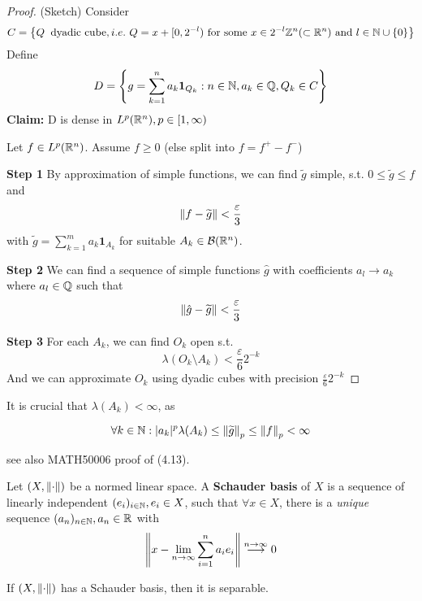 \documentclass{article}
\begin{document}
\begin{proof}
	(Sketch)  Consider
	$$
		C = \left\{Q\: \text{\ dyadic\ cube}, i.e. \ Q = x + [0, 2^{-l}) \text{\ for\ some\ } x \in 2^{-l} \inte^n(\subset \real^n) \text{\ and\ } l\in \natu \cup \{0\}\right\}
	$$
	Define
	$$
		D = \left\{g = \sum_{k=1}^n a_k \mathbf{1}_{Q_k}: n\in \mathbb{N}, a_k \in \mathbb{Q}, Q_k \in C \right\}
	$$
	\textbf{Claim:} D is dense in $L^p(\mathbb{R}^n), p \in [1, \infty)$

	Let $f \in L^p(\mathbb{R}^n)$. Assume $f \geq 0$ (else split into $f=f^+-f^-$)

	\textbf{Step 1} By approximation of simple functions, we can find $\widetilde{g}$ simple, s.t. $0 \leq \widetilde{g} \leq f$ and
	$$
		\left\|{f-\widetilde{g}}\right\| < \frac{\varepsilon}{3}
	$$
	with $\widetilde{g}=\sum_{k=1}^m a_k \mathbf{1}_{A_k}$ for suitable $A_k \in \mathcal{B}(\mathbb{R}^n)$.

	\textbf{Step 2} We can find a sequence of simple functions $\hat{g}$ with coefficients $a_l \to a_k$ where $a_l\in \mathbb{Q}$ such that
	$$
		\left\|{\hat{g}-\widetilde{g}}\right\| < \frac{\varepsilon}{3}
	$$

	\textbf{Step 3} For each $A_k$, we can find $O_k$ open s.t.
	$$
		\lambda(O_k\setminus A_k) < \frac{\varepsilon}{6} 2^{-k}
	$$
	And we can approximate $O_k$ using dyadic cubes with precision $\frac{\varepsilon}{6} 2^{-k}$
\end{proof}

It is crucial that $\lambda(A_k) < \infty$, as

$$
	\forall k \in \mathbb{N}: |a_k|^p \lambda(A_k) \leq \left\|{\widetilde{g}}\right\|_p \leq \left\|{f}\right\|_p < \infty
$$

see also MATH50006 proof of (4.13).

\begin{definition}

	Let $(X,\left\|{\cdot}\right\|)$ be a normed linear space. A \textbf{Schauder basis} of $X$ is a sequence of linearly independent $(e_i)_{i\in \mathbb{N}}, e_i \in X$, such that $\forall x \in X$,  there is a \textit{unique} sequence $(a_n)_{n\in \mathbb{N}}, a_n \in \mathbb{R}$ with
	$$
		\left\|{x - \lim_{n\to\infty}\sum_{i=1}^n a_i e_i}\right\| \overset{n\to \infty}{\longrightarrow} 0
	$$
\end{definition}


\begin{proposition}
	\label{Schauder implies separability}
	If $(X, \left\|{\cdot}\right\|)$ has a Schauder basis, then it is separable.
\end{proposition}
\end{document}
